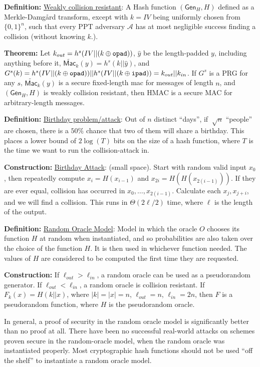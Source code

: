 \documentclass[12pt]{article}
\newcommand{\AAA}{\mathcal{A}}
\newcommand{\defn}[1]{{\bf Definition:} \underline{#1}}
\newcommand{\thm}[1]{{\bf Theorem:} \underline{#1}}
\newcommand{\con}[1]{{\bf Construction:} \underline{#1}}
\newcommand{\Mac}{\mathsf{Mac}}
\newcommand{\Gen}{\mathsf{Gen}}
\newcommand{\xor}{\oplus}
\newcommand{\opad}{{\tt opad}}
\newcommand{\ipad}{{\tt ipad}}
\begin{document}
\begin{multicols}{2}
\defn{Weakly collision resistant}: A Hash function $(\Gen_H, H)$ defined as a Merkle-Damg\r{a}rd transform, except with $k=IV$ being uniformly chosen from $\{0,1\}^n$, such that every PPT adversary $\AAA$ has at most negligible success finding a collision (without knowing $k$.).

\thm{} Let $k_{out}=h^s(IV||(k\xor\opad))$, $\hat{y}$ be the length-padded $y$, including anything before it, $\widetilde{\Mac}_k(y)=h^s(k||\hat{y})$, and $G^s(k)=h^s(IV||(k\xor\opad))||h^s(IV||(k\xor\ipad))=k_{out}||k_{in}$. If $G^s$ is a PRG for any $s$, $\widetilde{\Mac}_k(y)$ is a secure fixed-length mac for messages of length $n$, and $(\Gen_H,H)$ is weakly collision resistant, then HMAC is a secure MAC for arbitrary-length messages.

\defn{Birthday problem/attack}: Out of $n$ distinct ``days'', if $~\sqrt{n}$ ``people'' are chosen, there is a $50\%$ chance that two of them will share a birthday. This places a lower bound of $2\log(T)$ bits on the size of a hash function, where $T$ is the time we want to run the collision-attack in.

\con{Birthday Attack}: (small space). Start with random valid input $x_0$, then repeatedly compute $x_i=H(x_{i-1})$ and $x_{2i}=H(H(x_{2(i-1)}))$. If they are ever equal, collision has occurred in $x_0,\dots,x_{2(i-1)}$. Calculate each $x_j,x_{j+i}$, and we will find a collision. This runs in $\Theta(2{\ell/2})$ time, where $\ell$ is the length of the output.

\defn{Random Oracle Model}: Model in which the oracle $O$ chooses its function $H$ at random when instantiated, and so probabilities are also taken over the choice of the function $H$. It is then used in whichever function needed. The values of $H$ are considered to be computed the first time they are requested.

\con{} If $\ell_{out}>\ell_{in}$, a random oracle can be used as a pseudorandom generator. If $\ell_{out}<\ell_{in}$, a random oracle is collision resistant. If $F_k(x)=H(k||x)$, where $|k|=|x|=n$, $\ell_{out}=n$, $\ell_{in}=2n$, then $F$ is a pseudorandom function, where $H$ is the pseudorandom oracle.

In general, a proof of security in the random oracle model is significantly better than no proof at all. There have been no successful real-world attacks on schemes proven secure in the random-oracle model, when the random oracle was instantiated properly. Most cryptographic hash functions should not be used ``off the shelf'' to instantiate a random oracle model.


\end{multicols}
\end{document}
